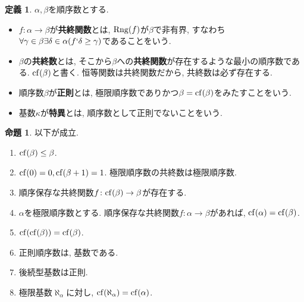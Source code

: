 \documentclass[a4paper, twoside]{bxjsarticle}
\theoremstyle{definition}
\newtheorem{prop}[thm]{命題}
\newtheorem{defn}[thm]{定義}
\begin{document}
        \begin{defn}
            $\alpha, \beta$を順序数とする. 
            \begin{itemize}
                \item $f\colon \alpha\to\beta$が\textbf{共終関数}とは, ${\rm Rng}(f)$が$\beta$で非有界, すなわち$\forall \gamma\in\beta\exists \delta\in\alpha(f`\delta\geq\gamma)$であることをいう.
                \item $\beta$の\textbf{共終数}とは, そこから$\beta$への\textbf{共終関数}が存在するような最小の順序数である. ${\rm cf}(\beta)$と書く. 恒等関数は共終関数だから, 共終数は必ず存在する.
                \item 順序数$\beta$が\textbf{正則}とは, 極限順序数でありかつ$\beta={\rm cf}(\beta)$をみたすことをいう.
                \item 基数$\kappa$が\textbf{特異}とは, 順序数として正則でないことをいう.
            \end{itemize}
        \end{defn}
        \begin{prop}
        以下が成立. 
            \begin{enumerate}
                \item ${\rm cf}(\beta)\leq\beta$.
                \item ${\rm cf}(0)=0, {\rm cf}(\beta+1)=1$. 極限順序数の共終数は極限順序数.
                \item 順序保存な共終関数$f\colon {\rm cf}(\beta)\to\beta$が存在する.
                \item $\alpha$を極限順序数とする. 順序保存な共終関数$f\colon \alpha\to\beta$があれば, ${\rm cf}(\alpha)={\rm cf}(\beta)$.
                \item ${\rm cf}({\rm cf}(\beta))={\rm cf}(\beta)$.
                \item 正則順序数は, 基数である.
                \item 後続型基数は正則.
                \item 極限基数$\aleph_\alpha$に対し, ${\rm cf}(\aleph_\alpha)={\rm cf}(\alpha)$.
            \end{enumerate}
        \end{prop}
\end{document}

